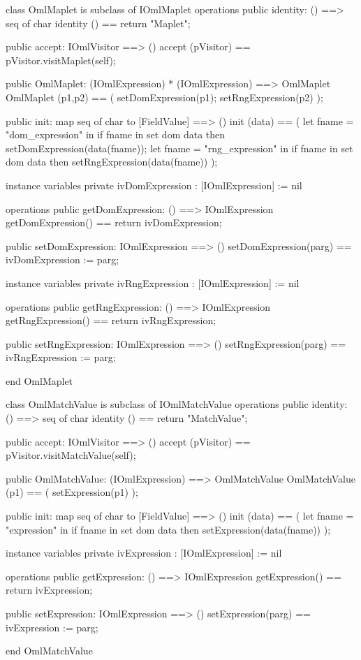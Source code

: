 \begin{vdm_al}
class OmlMaplet is subclass of IOmlMaplet
operations
  public identity: () ==> seq of char
  identity () == return "Maplet";

  public accept: IOmlVisitor ==> ()
  accept (pVisitor) == pVisitor.visitMaplet(self);

  public OmlMaplet:
      (IOmlExpression) *
      (IOmlExpression) ==> OmlMaplet
  OmlMaplet (p1,p2) == 
   ( setDomExpression(p1);
     setRngExpression(p2) );

  public init: map seq of char to [FieldValue] ==> ()
  init (data) ==
    ( let fname = "dom_expression" in
        if fname in set dom data
        then setDomExpression(data(fname));
      let fname = "rng_expression" in
        if fname in set dom data
        then setRngExpression(data(fname)) );

instance variables
  private ivDomExpression : [IOmlExpression] := nil

operations
  public getDomExpression: () ==> IOmlExpression
  getDomExpression() == return ivDomExpression;

  public setDomExpression: IOmlExpression ==> ()
  setDomExpression(parg) == ivDomExpression := parg;

instance variables
  private ivRngExpression : [IOmlExpression] := nil

operations
  public getRngExpression: () ==> IOmlExpression
  getRngExpression() == return ivRngExpression;

  public setRngExpression: IOmlExpression ==> ()
  setRngExpression(parg) == ivRngExpression := parg;

end OmlMaplet
\end{vdm_al}

\begin{vdm_al}
class OmlMatchValue is subclass of IOmlMatchValue
operations
  public identity: () ==> seq of char
  identity () == return "MatchValue";

  public accept: IOmlVisitor ==> ()
  accept (pVisitor) == pVisitor.visitMatchValue(self);

  public OmlMatchValue:
      (IOmlExpression) ==> OmlMatchValue
  OmlMatchValue (p1) == 
   ( setExpression(p1) );

  public init: map seq of char to [FieldValue] ==> ()
  init (data) ==
    ( let fname = "expression" in
        if fname in set dom data
        then setExpression(data(fname)) );

instance variables
  private ivExpression : [IOmlExpression] := nil

operations
  public getExpression: () ==> IOmlExpression
  getExpression() == return ivExpression;

  public setExpression: IOmlExpression ==> ()
  setExpression(parg) == ivExpression := parg;

end OmlMatchValue
\end{vdm_al}

